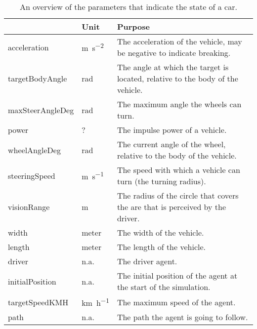 	\begin{table}
		\centering
		\begin{tabularx}{\textwidth}{>{\ttfamily}llX}
			\toprule
			\normalfont{Parameter}	&Unit & Purpose \\ 
			\midrule
			acceleration 			
				& \si{\meter\per\square\second} 
				& The acceleration of the vehicle, may be negative to indicate breaking.\\ 
			targetBodyAngle 		
				& \si{\radian}
				& The angle at which the target is located, relative to the body of the vehicle. \\ 
			maxSteerAngleDeg 		
				& \si{\radian}
				& The maximum angle the wheels can turn. \\ 
			power 					
				& \si{?}
				& The impulse power of a vehicle. \\ 
			wheelAngleDeg 			
				& \si{\radian}
				& The current angle of the wheel, relative to the body of the vehicle. \\ 
			steeringSpeed 			
				& \si{\meter\per\second}
				& The speed with which a vehicle can turn (the turning radius). \\ 
			visionRange 			
				& \si{\meter}
				& The radius of the circle that covers the are that is perceived by the driver.\\ 
			width 					
				& \si{meter} 
				& The width of the vehicle. \\ 
			length 					
				& \si{meter} 
				& The length of the vehicle. \\ 
			driver 					
				& n.a. 
				& The driver agent. \\ 
			initialPosition 		
				& n.a.
				& The initial position of the agent at the start of the simulation. \\ 
			targetSpeedKMH			
				& \si{\kilo\meter\per\hour}
				& The maximum speed of the agent. \\ 
			path					
				& n.a. 
				& The path the agent is going to follow. \\ 
			\bottomrule
		\end{tabularx}
		\caption{An overview of the parameters that indicate the state of a car.}
		\label{tab:par:method:model:overview:state:lowlevel:car}
	\end{table}

